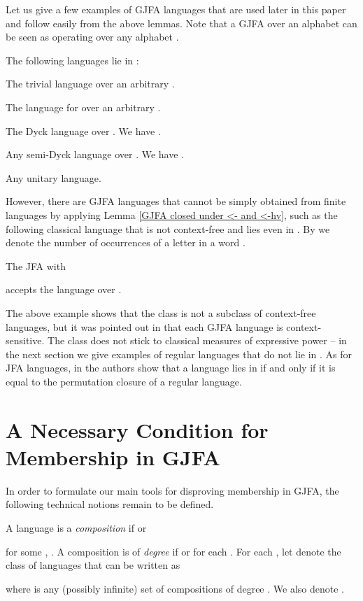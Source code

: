 \documentclass{ws-ijmpc}
\begin{document}
Let us give a few examples of GJFA languages that are used later in
this paper and follow easily from the above lemmas. Note that a GJFA
over an alphabet  can be seen as operating over any alphabet
. 
\begin{example}
\label{The-following-languages}The following languages lie in :
\begin{romanlist}
\item The trivial language  over
an arbitrary .
\item The language  for 
over an arbitrary .
\item The Dyck language  over .
We have .
\item Any semi-Dyck language  over .
We have . 
\item Any unitary language.
\end{romanlist}
\end{example}
However, there are GJFA languages that cannot be simply obtained from
finite languages by applying Lemma \ref{GJFA closed under <- and <-hv},
such as the following classical language that is not context-free
and lies even in . By  we denote
the number of occurrences of a letter  in a word .
\begin{example}
The JFA  with

accepts the language 
over .
\end{example}
The above example shows that the class  is not a subclass
of context-free languages, but it was pointed out in \citep{athMED1}
that each GJFA language is context-sensitive. The class 
does not stick to classical measures of expressive power -- in the
next section we give examples of regular languages that do not lie
in . As for JFA languages, in \citep{athMED1book}
the authors show that a language lies in  if and only
if it is equal to the permutation closure of a regular language.


\section{A Necessary Condition for Membership in GJFA}

In order to formulate our main tools for disproving membership in
GJFA, the following technical notions remain to be defined.
\begin{definition}
A language  is a \emph{composition }if 
or 

for some , . A composition
 is of \emph{degree}  if 
or for each .
For each , let  denote the class of languages
 that can be written as 

where  is any (possibly infinite) set of compositions
of degree . We also denote .
\end{definition}
\end{document}
